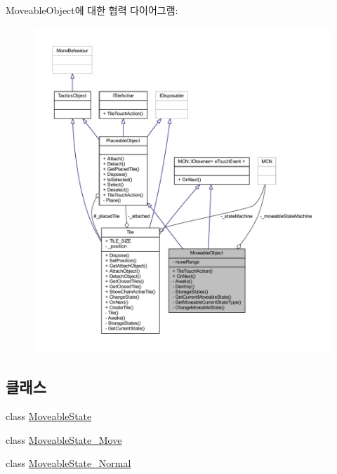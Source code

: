 Moveable\+Object에 대한 협력 다이어그램\+:\nopagebreak
\begin{figure}[H]
\begin{center}
\leavevmode
\includegraphics[width=350pt]{class_moveable_object__coll__graph}
\end{center}
\end{figure}
\subsection*{클래스}
\begin{DoxyCompactItemize}
\item 
class \hyperlink{class_moveable_object_1_1_moveable_state}{Moveable\+State}
\item 
class \hyperlink{class_moveable_object_1_1_moveable_state___move}{Moveable\+State\+\_\+\+Move}
\item 
class \hyperlink{class_moveable_object_1_1_moveable_state___normal}{Moveable\+State\+\_\+\+Normal}
\end{DoxyCompactItemize}
